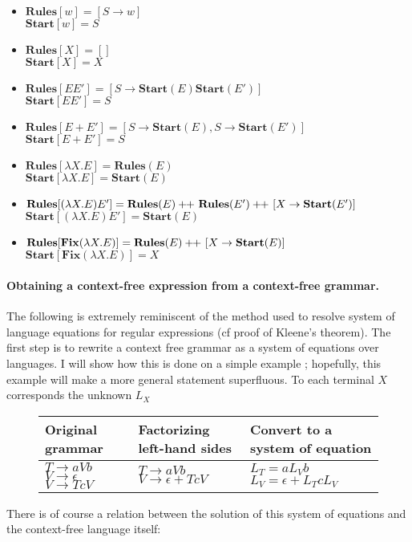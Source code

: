 \begin{itemize}
\item 
$\mathbf{Rules}[w] = [S\rightarrow w]$\\
$\mathbf{Start}[w] = S$
\item 
$\mathbf{Rules}[X] = []$\\
$\mathbf{Start}[X] = X$
\item 
$\mathbf{Rules}[EE'] = [S \rightarrow \mathbf{Start}(E)\mathbf{Start}(E')]$\\
$\mathbf{Start}[EE'] = S$
\item 
$\mathbf{Rules}[E + E'] = [S \rightarrow \mathbf{Start}(E), S\rightarrow\mathbf{Start}(E')]$\\
$\mathbf{Start}[E + E'] = S$
\item 
$\mathbf{Rules}[\lambda X. E] = \mathbf{Rules}(E)$\\
$\mathbf{Start}[\lambda X. E] = \mathbf{Start}(E)$
\item 
$\mathbf{Rules}[(\lambda X. E)E'] = \mathbf{Rules}(E) +\hspace{-3pt}+\ \mathbf{Rules}(E') +\hspace{-3pt}+\ [X\rightarrow \textbf{Start}(E')]$\\
$\mathbf{Start}[(\lambda X. E)E'] = \mathbf{Start}(E)$
\item 
$\mathbf{Rules}[\mathbf{Fix}(\lambda X. E)] = \mathbf{Rules}(E) +\hspace{-3pt}+\ [X\rightarrow \textbf{Start}(E)]$\\
$\mathbf{Start}[\mathbf{Fix}(\lambda X. E)] = X$
\end{itemize}

\paragraph*{Obtaining a context-free expression from a context-free grammar.} The following is extremely reminiscent of the method used to resolve system of language equations for regular expressions (cf proof of Kleene's theorem). The first step is to rewrite a context free grammar as a system of equations over languages. I will show how this is done on a simple example ; hopefully, this example will make a more general statement superfluous. To each terminal $X$ corresponds the unknown $L_X$

\begin{figure}
\begin{tabularx}{\textwidth}{X  X  X}
Original grammar & Factorizing left-hand sides & Convert to a system of equation\\
\midrule
$T \rightarrow aVb$\newline
$V \rightarrow \epsilon$ \newline
$V \rightarrow T c V$
&
$T \rightarrow aVb$\newline
$V \rightarrow \epsilon + T c V$
&
$L_T = aL_Vb$\newline
$L_V = \epsilon + L_T c L_V$
\end{tabularx}
\end{figure}
%
There is of course a relation between the solution of this system of equations and the context-free language itself:

